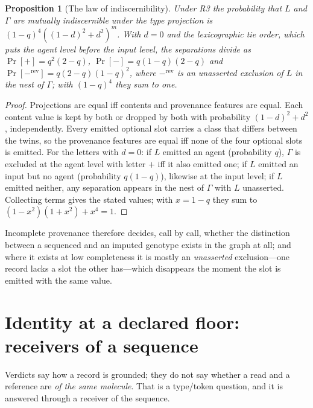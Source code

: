 \documentclass[11pt,twocolumn,a4paper]{article}
\theoremstyle{plain}
\newtheorem{proposition}[theorem]{Proposition}
\theoremstyle{definition}
\theoremstyle{remark}
\newcommand{\lp}{\mathtt{+}}
\newcommand{\lm}{\mathtt{-}}
\begin{document}
\begin{proposition}[The law of indiscernibility]
\label{prop:twinprob}
Under R3 the probability that $L$ and $\Gamma$ are mutually indiscernible under
the type projection is $(1-q)^4((1-d)^2+d^2)^m$. With $d=0$ and the
lexicographic tie order, which puts the agent level before the input level,
the separations divide as $\Pr[\lp]=q^2(2-q)$, $\Pr[\lm]=q(1-q)(2-q)$ and
$\Pr[\lm^{\mathrm{rev}}]=q(2-q)(1-q)^2$, where $\lm^{\mathrm{rev}}$ is an
unasserted exclusion of $L$ in the nest of $\Gamma$; with $(1-q)^4$ they sum to
one.
\end{proposition}

\begin{proof}
Projections are equal iff contents and provenance features are equal. Each
content value is kept by both or dropped by both with probability
$(1-d)^2+d^2$, independently. Every emitted optional slot carries a class that
differs between the twins, so the provenance features are equal iff none of
the four optional slots is emitted. For the letters with $d=0$: if $L$ emitted
an agent (probability $q$), $\Gamma$ is excluded at the agent level with letter
$\lp$ iff it also emitted one; if $L$ emitted an input but no agent
(probability $q(1-q)$), likewise at the input level; if $L$ emitted neither,
any separation appears in the nest of $\Gamma$ with $L$ unasserted. Collecting
terms gives the stated values; with $x=1-q$ they sum to
$(1-x^2)(1+x^2)+x^4=1$.
\end{proof}

Incomplete provenance therefore decides, call by call, whether the
distinction between a sequenced and an imputed genotype exists in the graph
at all; and where it exists at low completeness it is mostly an
\emph{unasserted} exclusion---one record lacks a slot the other has---which
disappears the moment the slot is emitted with the same value.

\section{Identity at a declared floor: receivers of a sequence}
\label{sec:floor}

Verdicts say how a record is grounded; they do not say whether a read and a
reference are \emph{of the same molecule}. That is a type/token question, and
it is answered through a receiver of the sequence.
\end{document}
